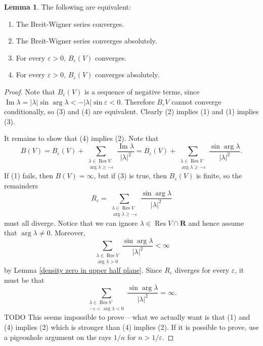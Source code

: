 \documentclass[12pt]{report}
\newcommand{\RR}{\mathbf{R}}
\DeclareMathOperator{\Res}{Res}
\renewcommand{\Im}{\operatorname{Im}}
\theoremstyle{definition}
\newtheorem{lemma}[theorem]{Lemma}
\begin{document}
\begin{lemma}
\label{epsilon absolute convergence}
The following are equivalent:
\begin{enumerate}
\item The Breit-Wigner series converges.
\item The Breit-Wigner series converges absolutely.
\item For every $\varepsilon > 0$, $B_\varepsilon(V)$ converges.
\item For every $\varepsilon > 0$, $B_\varepsilon(V)$ converges absolutely.
\end{enumerate}
\end{lemma}
\begin{proof}
Note that $B_\varepsilon(V)$ is a sequence of negative terms, since $\Im \lambda = |\lambda| \sin \arg \lambda < -|\lambda| \sin \varepsilon < 0$. Therefore $B_\varepsilon V$ cannot converge conditionally, so (3) and (4) are equivalent. Clearly (2) implies (1) and (1) implies (3).

It remains to show that (4) implies (2). Note that
$$B(V) = B_\varepsilon(V) + \sum_{\substack{\lambda \in \Res V\\\arg \lambda \geq -\varepsilon}} \frac{\Im \lambda}{|\lambda|^2}
= B_\varepsilon(V) + \sum_{\substack{\lambda \in \Res V\\\arg \lambda \geq -\varepsilon}} \frac{\sin \arg \lambda}{|\lambda|^2}.$$
If (1) fails, then $B(V) = \infty$, but if (3) is true, then $B_\varepsilon(V)$ is finite, so the remainders
$$R_\varepsilon = \sum_{\substack{\lambda \in \Res V\\\arg \lambda \geq -\varepsilon}} \frac{\sin \arg \lambda}{|\lambda|^2}$$
must all diverge. Notice that we can ignore $\lambda \in \Res V \cap \RR$ and hence assume that $\arg \lambda \neq 0$. Moreover,
$$\sum_{\substack{\lambda \in \Res V\\\arg \lambda > 0}} \frac{\sin \arg \lambda}{|\lambda|^2} < \infty$$
by Lemma \ref{density zero in upper half plane}. Since $R_\varepsilon$ diverges for every $\varepsilon$, it must be that
$$\sum_{\substack{\lambda \in \Res V\\-\varepsilon < \arg \lambda < 0}} \frac{\sin \arg \lambda}{|\lambda|^2} = \infty.$$
TODO This seems impossible to prove -- what we actually want is that (1) and (4) implies (2) which is stronger than (4) implies (2).
If it is possible to prove, use a pigeonhole argument on the rays $1/n$ for $n > 1/\varepsilon$.
\end{proof}
\end{document}
